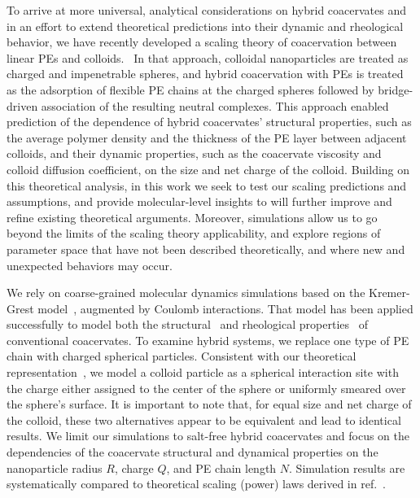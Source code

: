 \documentclass[journal=mamobx, manuscript=article]{achemso}
\begin{document}
To arrive at more universal, analytical considerations on hybrid coacervates and in an effort to extend theoretical predictions into their dynamic and rheological behavior, we have recently developed a scaling theory of coacervation between linear PEs and colloids.~\cite{artem2022hybrid} In that approach, colloidal nanoparticles are treated as charged and impenetrable spheres, and hybrid coacervation with PEs is treated as the adsorption of flexible PE chains at the charged spheres followed by bridge-driven association of the resulting neutral complexes. This approach enabled prediction of the dependence of hybrid coacervates' structural properties, such as the average polymer density and the thickness of the PE layer between adjacent colloids, and their dynamic properties, such as the coacervate viscosity and colloid diffusion coefficient, on the size and net charge of the colloid. Building on this theoretical analysis, in this work we seek to test our scaling predictions and assumptions, and provide molecular-level insights to will further improve and refine existing theoretical arguments. Moreover, simulations allow us to go beyond the limits of the scaling theory applicability, and explore regions of parameter space that have not been described theoretically, and where new and unexpected behaviors may occur.

We rely on coarse-grained molecular dynamics simulations based on the Kremer-Grest model~\cite{kremer1990dynamics}, augmented by Coulomb interactions. That model has been applied  successfully to model both the structural~\cite{yu2021complex,andreev2018complex,bobbili2021simple} and rheological properties~\cite{yu2020crossover,liang2022coarse} of conventional coacervates. To examine hybrid systems, we replace one type of PE chain with charged spherical particles. Consistent with our theoretical representation~\cite {artem2022hybrid}, we model a colloid particle as a spherical interaction site with the charge either assigned to the center of the sphere or uniformly smeared over the sphere's surface. It is important to note that, for equal size and net charge of the colloid, these two alternatives appear to be equivalent and lead to identical results. We limit our simulations to salt-free hybrid coacervates and focus on the dependencies of the coacervate structural and dynamical properties on the nanoparticle radius $R$, charge $Q$, and PE chain length $N$. Simulation results are systematically compared to theoretical scaling (power) laws derived in ref.~.
\end{document}
